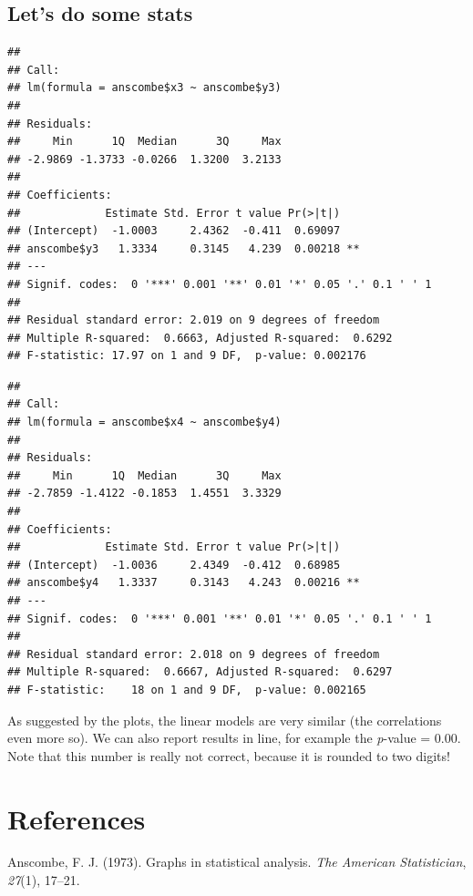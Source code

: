 \documentclass[english,floatsintext,man]{apa6}
\begin{document}
\subsection{Let's do some stats}\label{lets-do-some-stats}

\begin{verbatim}
## 
## Call:
## lm(formula = anscombe$x3 ~ anscombe$y3)
## 
## Residuals:
##     Min      1Q  Median      3Q     Max 
## -2.9869 -1.3733 -0.0266  1.3200  3.2133 
## 
## Coefficients:
##             Estimate Std. Error t value Pr(>|t|)   
## (Intercept)  -1.0003     2.4362  -0.411  0.69097   
## anscombe$y3   1.3334     0.3145   4.239  0.00218 **
## ---
## Signif. codes:  0 '***' 0.001 '**' 0.01 '*' 0.05 '.' 0.1 ' ' 1
## 
## Residual standard error: 2.019 on 9 degrees of freedom
## Multiple R-squared:  0.6663, Adjusted R-squared:  0.6292 
## F-statistic: 17.97 on 1 and 9 DF,  p-value: 0.002176
\end{verbatim}

\begin{verbatim}
## 
## Call:
## lm(formula = anscombe$x4 ~ anscombe$y4)
## 
## Residuals:
##     Min      1Q  Median      3Q     Max 
## -2.7859 -1.4122 -0.1853  1.4551  3.3329 
## 
## Coefficients:
##             Estimate Std. Error t value Pr(>|t|)   
## (Intercept)  -1.0036     2.4349  -0.412  0.68985   
## anscombe$y4   1.3337     0.3143   4.243  0.00216 **
## ---
## Signif. codes:  0 '***' 0.001 '**' 0.01 '*' 0.05 '.' 0.1 ' ' 1
## 
## Residual standard error: 2.018 on 9 degrees of freedom
## Multiple R-squared:  0.6667, Adjusted R-squared:  0.6297 
## F-statistic:    18 on 1 and 9 DF,  p-value: 0.002165
\end{verbatim}

As suggested by the plots, the linear models are very similar (the
correlations even more so). We can also report results in line, for
example the \emph{p}-value = 0.00. Note that this number is really not
correct, because it is rounded to two digits!

\newpage

\section{References}\label{references}

\setlength{\parindent}{-0.5in} \setlength{\leftskip}{0.5in}

\hypertarget{refs}{}
\hypertarget{ref-Anscombe}{}
Anscombe, F. J. (1973). Graphs in statistical analysis. \emph{The
American Statistician}, \emph{27}(1), 17--21.
\end{document}
